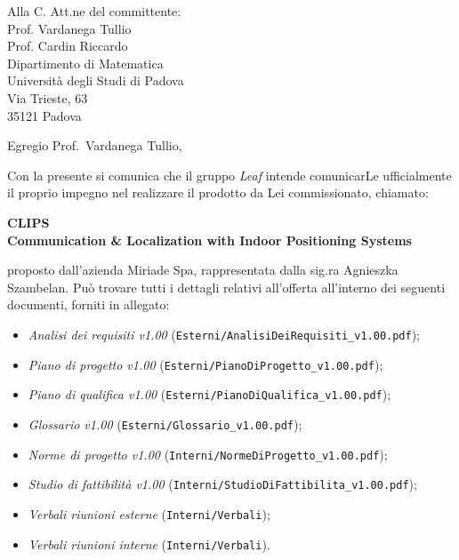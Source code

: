 \documentclass[a4paper,12pt]{letteracdp}
\author{Federico Tavella}
\date{22 gennaio 2016}
\begin{document}
\pagestyle{myfront}
	\begin{letter}{
		Alla C. Att.ne del committente: \\
		Prof. Vardanega Tullio \\
		Prof. Cardin Riccardo \\
		Dipartimento di Matematica \\
		Università degli Studi di Padova \\
		Via Trieste, 63 \\
		35121 Padova}
		
		\opening{Egregio Prof.~Vardanega Tullio,}
		Con la presente si comunica che il gruppo \textit{Leaf} intende comunicarLe ufficialmente il proprio impegno nel realizzare il prodotto da Lei commissionato, chiamato:
\begin{center}
	\textbf{CLIPS \\ Communication \& Localization with Indoor Positioning Systems}
\end{center}
proposto dall'azienda Miriade Spa, rappresentata dalla sig.ra Agnieszka Szambelan.
Può trovare tutti i dettagli relativi all'offerta all'interno dei seguenti documenti, forniti in allegato:

\begin{itemize}
	\item \textit{Analisi dei requisiti v1.00} (\texttt{Esterni/AnalisiDeiRequisiti\_v1.00.pdf});

	\item \textit{Piano di progetto v1.00} (\texttt{Esterni/PianoDiProgetto\_v1.00.pdf});

	\item \textit{Piano di qualifica v1.00} (\texttt{Esterni/PianoDiQualifica\_v1.00.pdf});
	
	\item \textit{Glossario v1.00} (\texttt{Esterni/Glossario\_v1.00.pdf});
	
	\item \textit{Norme di progetto v1.00} (\texttt{Interni/NormeDiProgetto\_v1.00.pdf});

	\item \textit{Studio di fattibilità v1.00} (\texttt{Interni/StudioDiFattibilita\_v1.00.pdf});

	\item \textit{Verbali riunioni esterne}	(\texttt{Interni/Verbali});
	
	\item \textit{Verbali riunioni interne} (\texttt{Interni/Verbali}).
	

\end{itemize}
\end{letter}
\end{document}
